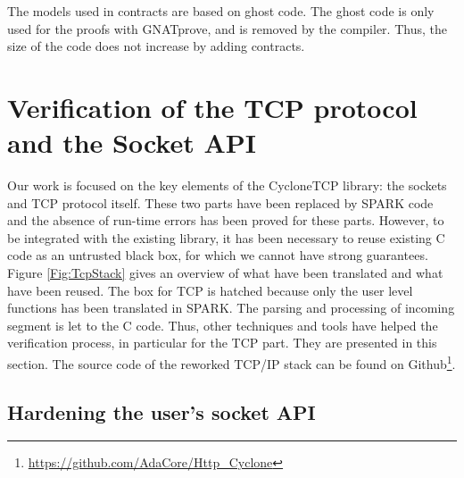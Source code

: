 \documentclass[runningheads]{llncs}
\begin{document}
    The models used in contracts are based on ghost code. The ghost code is only
    used for the proofs with GNATprove, and is removed by the compiler. Thus, the size
    of the code does not increase by adding contracts.



\section{Verification of the TCP protocol and the Socket API}
\label{sec:verif}

    Our work is focused on the key elements of the CycloneTCP library: the sockets and TCP protocol itself.
    These two parts have been replaced by SPARK code and the absence of run-time errors has been proved for
    these parts.
    However, to be integrated with the existing library, it has been necessary to reuse existing C code
    as an untrusted black box, for which we cannot have strong guarantees. Figure \ref{Fig:TcpStack} gives an overview of
    what have been translated and what have been reused. The box for TCP is hatched because only the user level functions
    has been translated in SPARK. The parsing and processing of incoming segment is let to the C code.
    Thus, other techniques and tools have helped the verification process, in particular for the TCP part. They are presented in this section.
    The source code of the reworked TCP/IP stack can be found on Github\footnote{\url{https://github.com/AdaCore/Http_Cyclone}}.

\subsection{Hardening the user's socket API}
\end{document}
